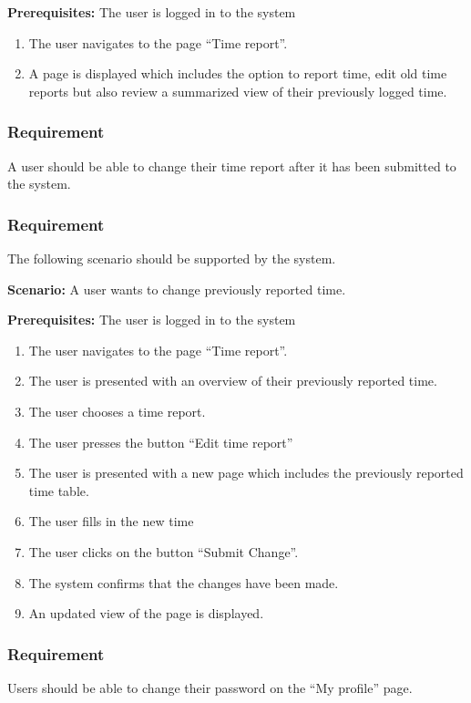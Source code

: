 \documentclass{article}
\begin{document}
\textbf{Prerequisites:} The user is logged in to the system
\begin{enumerate}


\item The user navigates to the page “Time report”.
\item A page is displayed which includes the option to report time, edit old time reports but also review a summarized view of their previously logged time. 
\end{enumerate}

\subsubsection{Requirement}
A user should be able to change their time report after it has been submitted to the system.

\subsubsection{Requirement}
The following scenario should be supported by the system.

\textbf{Scenario:} A user wants to change previously reported time.

\textbf{Prerequisites:} The user is logged in to the system

\begin{enumerate}

\item The user navigates to the page “Time report”.
\item The user is presented with an overview of their previously reported time. 
\item The user chooses a time report.
\item The user presses the button “Edit time report”
\item The user is presented with a new page which includes the previously reported time table. 
\item The user fills in the new time
\item The user clicks on the button “Submit Change”.
\item The system confirms that the changes have been made.  
\item An updated view of the page is displayed.

\end{enumerate}

\subsubsection{Requirement}
Users should be able to change their password on the “My profile” page.
\end{document}
